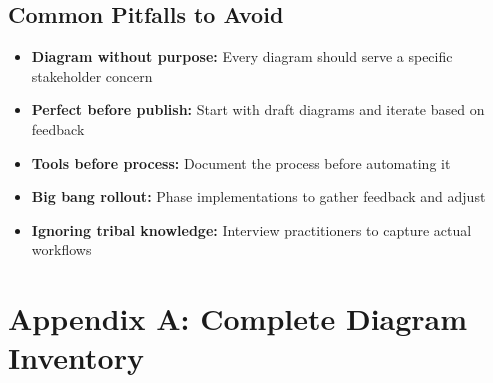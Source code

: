\documentclass[11pt,letterpaper]{article}
\begin{document}
\subsection{Common Pitfalls to Avoid}

\begin{itemize}[nosep]
    \item \textbf{Diagram without purpose:} Every diagram should serve a specific stakeholder concern
    \item \textbf{Perfect before publish:} Start with draft diagrams and iterate based on feedback
    \item \textbf{Tools before process:} Document the process before automating it
    \item \textbf{Big bang rollout:} Phase implementations to gather feedback and adjust
    \item \textbf{Ignoring tribal knowledge:} Interview practitioners to capture actual workflows
\end{itemize}

\newpage

\section*{Appendix A: Complete Diagram Inventory}
\end{document}
